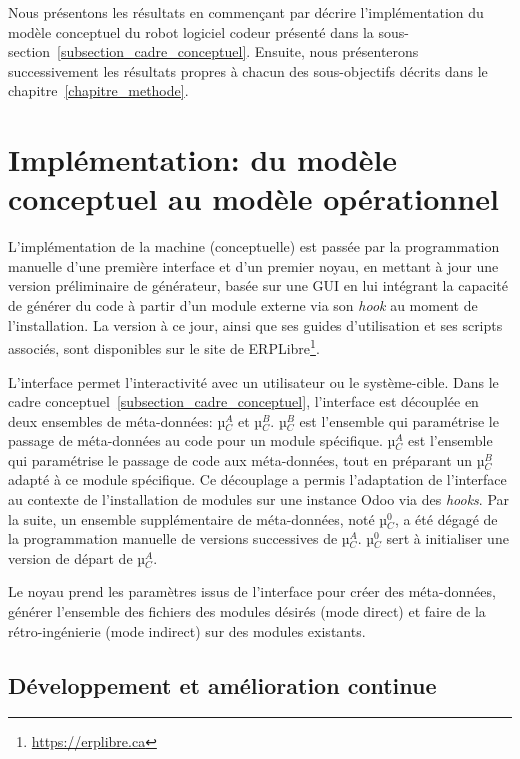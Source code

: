 \label{sec:Theme2}

Nous présentons les résultats en commençant par décrire l’implémentation du modèle conceptuel du robot logiciel codeur présenté dans la sous-section~\ref{subsection_cadre_conceptuel}. Ensuite, nous présenterons successivement les résultats propres à chacun des sous-objectifs décrits dans le chapitre~\ref{chapitre_methode}.

\section{Implémentation: du modèle conceptuel au modèle opérationnel}

L’implémentation de la machine (conceptuelle) est passée par la programmation manuelle d’une première interface et d’un premier noyau, en mettant à jour une version préliminaire de générateur, basée sur une GUI\cite{bluiksnot_repo} en lui intégrant la capacité de générer du code à partir d’un module externe via son \textit{hook} au moment de l’installation. La version à ce jour, ainsi que ses guides d’utilisation et ses scripts associés, sont disponibles sur le site de ERPLibre\footnote{\url{https://erplibre.ca}}.

L’interface permet l’interactivité avec un utilisateur ou le système-cible. Dans le cadre conceptuel~\ref{subsection_cadre_conceptuel}, l’interface est découplée en deux ensembles de méta-données: µ$_C^A$ et µ$_C^B$. µ$_C^B$ est l’ensemble qui paramétrise le passage de méta-données au code pour un module spécifique. µ$_C^A$ est l’ensemble qui paramétrise le passage de code aux méta-données, tout en préparant un µ$_C^B$ adapté à ce module spécifique. Ce découplage a permis l’adaptation de l’interface au contexte de l’installation de modules sur une instance Odoo via des \textit{hooks}. Par la suite, un ensemble supplémentaire de méta-données, noté µ$_C^0$, a été dégagé de la programmation manuelle de versions successives de µ$_C^A$. µ$_C^0$ sert à initialiser une version de départ de µ$_C^A$.

Le noyau prend les paramètres issus de l’interface pour créer des méta-données, générer l’ensemble des fichiers des modules désirés (mode direct) et faire de la rétro-ingénierie (mode indirect) sur des modules existants.

\subsection{Développement et amélioration continue}

